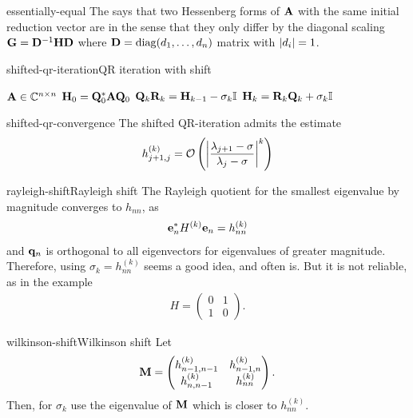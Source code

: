 \begin{Definition}{essentially-equal}
  The  says that two Hessenberg forms of $\mata$ with the same initial reduction vector are  in the sense that they only differ by the diagonal scaling $\matg = \matd^{-1}\matH\matd$ where $\matd=\diag(d_1,\dots,d_n)$ matrix with $\abs{d_{i}} = 1$.
\end{Definition}

\begin{Algorithm*}{shifted-qr-iteration}{QR iteration with shift}
  \begin{algorithmic}[1]
    \Require $\mata\in\Cnn$
    \State $\matH_0 = \matq_0^*\mata\matq_0$
    \State $\matq_k\matr_k = \matH_{k-1} - \sigma_k\id$
    \State $\matH_{k} = \matr_k\matq_k + \sigma_k\id$
    \EndFor
  \end{algorithmic}
\end{Algorithm*}

\begin{Lemma}{shifted-qr-convergence}
  The shifted QR-iteration admits the estimate
  \begin{gather}
    h_{j+1,j}^{(k)} = \bigo \left(\abs*{\frac{\lambda_{j+1}-\sigma}{\lambda_j-\sigma}}^k\right)
  \end{gather}
\end{Lemma}

\begin{Example*}{rayleigh-shift}{Rayleigh shift}
  The Rayleigh quotient for the smallest eigenvalue by magnitude
  converges to $h_{nn}$, as
  \begin{gather}
    \ve_n^* H^{(k)} \ve_n = h_{nn}^{(k)}
  \end{gather}
  and $\vq_n$ is orthogonal to all eigenvectors for eigenvalues of
  greater magnitude. Therefore, using $\sigma_k = h_{nn}^{(k)}$ seems
  a good idea, and often is. But it is not reliable, as in the example
  \begin{gather}
    H =
    \begin{pmatrix}
      0 & 1 \\ 1 & 0
    \end{pmatrix}.
  \end{gather}
\end{Example*}

\begin{Definition*}{wilkinson-shift}{Wilkinson shift}
  Let
  \begin{gather}
    \matm =
    \begin{pmatrix}
      h_{n-1,n-1}^{(k)}&h_{n-1,n}^{(k)}\\h_{n,n-1}^{(k)}&h_{nn}^{(k)}
    \end{pmatrix}.
  \end{gather}
  Then, for $\sigma_k$ use the eigenvalue of $\matm$ which is closer
  to $h_{nn}^{(k)}$.
\end{Definition*}

